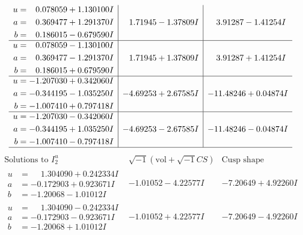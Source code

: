 \documentclass[1p]{elsarticle_modified}
\theoremstyle{definition}
\newcommand{\I}{\sqrt{-1}}
\begin{document}
$$\begin{array}{c|c|c}
\begin{aligned}
u &= \phantom{-}0.078059 + 1.130100 I \\
a &= \phantom{-}0.369477 + 1.291370 I \\
b &= \phantom{-}0.186015 - 0.679590 I\end{aligned}
 & \phantom{-}1.71945 - 1.37809 I & \phantom{-}3.91287 - 1.41254 I \\ \hline\begin{aligned}
u &= \phantom{-}0.078059 - 1.130100 I \\
a &= \phantom{-}0.369477 - 1.291370 I \\
b &= \phantom{-}0.186015 + 0.679590 I\end{aligned}
 & \phantom{-}1.71945 + 1.37809 I & \phantom{-}3.91287 + 1.41254 I \\ \hline\begin{aligned}
u &= -1.207030 + 0.342060 I \\
a &= -0.344195 - 1.035250 I \\
b &= -1.007410 + 0.797418 I\end{aligned}
 & -4.69253 + 2.67585 I & -11.48246 + 0.04874 I \\ \hline\begin{aligned}
u &= -1.207030 - 0.342060 I \\
a &= -0.344195 + 1.035250 I \\
b &= -1.007410 - 0.797418 I\end{aligned}
 & -4.69253 - 2.67585 I & -11.48246 - 0.04874 I\\
 \hline 
 \end{array}$$\newpage$$\begin{array}{c|c|c}  
\text{Solutions to }I^u_{2}& \I (\text{vol} + \sqrt{-1}CS) & \text{Cusp shape}\\
 \hline 
\begin{aligned}
u &= \phantom{-}1.304090 + 0.242334 I \\
a &= -0.172903 + 0.923671 I \\
b &= -1.20068 - 1.01012 I\end{aligned}
 & -1.01052 - 4.22577 I & -7.20649 + 4.92260 I \\ \hline\begin{aligned}
u &= \phantom{-}1.304090 - 0.242334 I \\
a &= -0.172903 - 0.923671 I \\
b &= -1.20068 + 1.01012 I\end{aligned}
 & -1.01052 + 4.22577 I & -7.20649 - 4.92260 I \\ \hline\begin{aligned}

\end{aligned}
\end{array}$$
\end{document}
